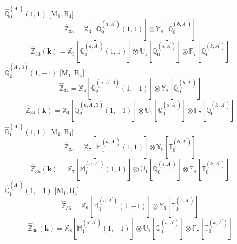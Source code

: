 \documentclass[fleqn,10pt,landscape]{article}
\begin{document}
\begin{itemize}
\begin{dmath*}
\end{dmath*}
\vspace{4mm}
\noindent {} $\,\,\,\hat{\mathbb{Q}}_{0}^{(A^{\prime})}(1,1)$ [M$_{1}$,\,B$_{4}$]
\begin{dmath*}
\hat{\mathbb{Z}}_{33}=\mathbb{X}_{3}[\mathbb{Q}_{0}^{(a,A^{\prime})}(1,1)] \otimes\mathbb{Y}_{8}[\mathbb{Q}_{0}^{(b,A^{\prime})}]
\end{dmath*}
\begin{dmath*}
\hat{\mathbb{Z}}_{33}(\bm{k})=\mathbb{X}_{3}[\mathbb{Q}_{0}^{(a,A^{\prime})}(1,1)] \otimes\mathbb{U}_{1}[\mathbb{Q}_{0}^{(s,A^{\prime})}] \otimes\mathbb{F}_{7}[\mathbb{Q}_{0}^{(k,A^{\prime})}]
\end{dmath*}
\vspace{4mm}
\noindent {} $\,\,\,\hat{\mathbb{Q}}_{2}^{(A^{\prime},3)}(1,-1)$ [M$_{1}$,\,B$_{4}$]
\begin{dmath*}
\hat{\mathbb{Z}}_{34}=\mathbb{X}_{4}[\mathbb{Q}_{2}^{(a,A^{\prime},3)}(1,-1)] \otimes\mathbb{Y}_{8}[\mathbb{Q}_{0}^{(b,A^{\prime})}]
\end{dmath*}
\begin{dmath*}
\hat{\mathbb{Z}}_{34}(\bm{k})=\mathbb{X}_{4}[\mathbb{Q}_{2}^{(a,A^{\prime},3)}(1,-1)] \otimes\mathbb{U}_{1}[\mathbb{Q}_{0}^{(s,A^{\prime})}] \otimes\mathbb{F}_{7}[\mathbb{Q}_{0}^{(k,A^{\prime})}]
\end{dmath*}
\vspace{4mm}
\noindent {} $\,\,\,\hat{\mathbb{G}}_{1}^{(A^{\prime})}(1,1)$ [M$_{1}$,\,B$_{4}$]
\begin{dmath*}
\hat{\mathbb{Z}}_{35}=\mathbb{X}_{7}[\mathbb{M}_{1}^{(a,A^{\prime})}(1,1)] \otimes\mathbb{Y}_{9}[\mathbb{T}_{0}^{(b,A^{\prime})}]
\end{dmath*}
\begin{dmath*}
\hat{\mathbb{Z}}_{35}(\bm{k})=\mathbb{X}_{7}[\mathbb{M}_{1}^{(a,A^{\prime})}(1,1)] \otimes\mathbb{U}_{1}[\mathbb{Q}_{0}^{(s,A^{\prime})}] \otimes\mathbb{F}_{8}[\mathbb{T}_{0}^{(k,A^{\prime})}]
\end{dmath*}
\vspace{4mm}
\noindent {} $\,\,\,\hat{\mathbb{G}}_{1}^{(A^{\prime})}(1,-1)$ [M$_{1}$,\,B$_{4}$]
\begin{dmath*}
\hat{\mathbb{Z}}_{36}=\mathbb{X}_{8}[\mathbb{M}_{1}^{(a,A^{\prime})}(1,-1)] \otimes\mathbb{Y}_{9}[\mathbb{T}_{0}^{(b,A^{\prime})}]
\end{dmath*}
\begin{dmath*}
\hat{\mathbb{Z}}_{36}(\bm{k})=\mathbb{X}_{8}[\mathbb{M}_{1}^{(a,A^{\prime})}(1,-1)] \otimes\mathbb{U}_{1}[\mathbb{Q}_{0}^{(s,A^{\prime})}] \otimes\mathbb{F}_{8}[\mathbb{T}_{0}^{(k,A^{\prime})}]

\end{dmath*}
\end{itemize}
\end{document}
